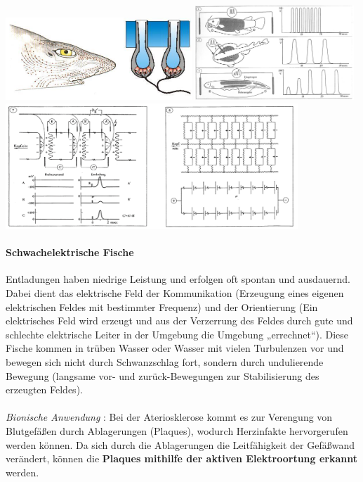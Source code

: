 \begin{center}
    \includegraphics[width=7cm]{lec8/figures/hai.png}
    \hfill
    \includegraphics[width=6cm]{lec8/figures/starkelektrisch.png}
    \\
    \includegraphics[width=11cm]{lec8/figures/muskelzellen.png}
\end{center}

\paragraph{Schwachelektrische Fische} Entladungen haben niedrige Leistung und erfolgen oft spontan und ausdauernd. Dabei dient das elektrische Feld der Kommunikation (Erzeugung eines eigenen elektrischen Feldes mit bestimmter Frequenz) und der Orientierung (Ein elektrisches Feld wird erzeugt und aus der Verzerrung des Feldes durch gute und schlechte elektrische Leiter in der Umgebung die Umgebung „errechnet“). Diese Fische kommen in trüben Wasser oder Wasser mit vielen Turbulenzen vor und bewegen sich nicht durch Schwanzschlag fort, sondern durch undulierende Bewegung (langsame vor- und zurück-Bewegungen zur Stabilisierung des erzeugten Feldes).
\\\\
\textit{Bionische Anwendung} \dangersign: Bei der Ateriosklerose kommt es zur Verengung von Blutgefäßen durch Ablagerungen (Plaques), wodurch Herzinfakte hervorgerufen werden können. Da sich durch die Ablagerungen die Leitfähigkeit der Gefäßwand verändert, können die \textbf{Plaques mithilfe der aktiven Elektroortung erkannt} werden.


